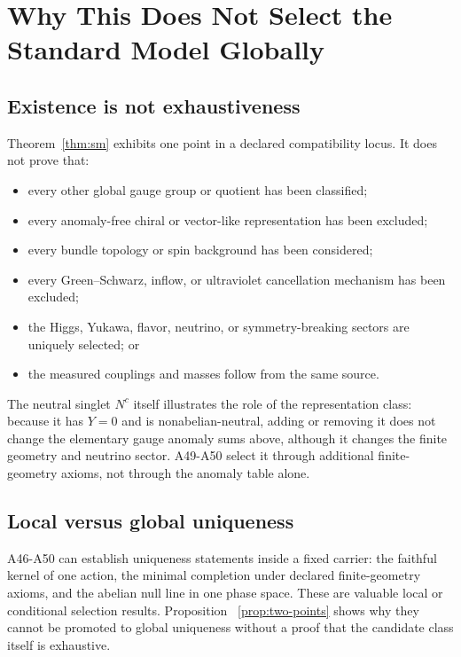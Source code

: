 \documentclass[11pt]{article}
\begin{document}
\section{Why This Does Not Select the Standard Model Globally}

\subsection{Existence is not exhaustiveness}

Theorem~\ref{thm:sm} exhibits one point in a declared compatibility locus.
It does not prove that:
\begin{itemize}
\item every other global gauge group or quotient has been classified;
\item every anomaly-free chiral or vector-like representation has been
excluded;
\item every bundle topology or spin background has been considered;
\item every Green--Schwarz, inflow, or ultraviolet cancellation mechanism has
been excluded;
\item the Higgs, Yukawa, flavor, neutrino, or symmetry-breaking sectors are
uniquely selected; or
\item the measured couplings and masses follow from the same source.
\end{itemize}

The neutral singlet $N^c$ itself illustrates the role of the representation
class: because it has $Y=0$ and is nonabelian-neutral, adding or removing it
does not change the elementary gauge anomaly sums above, although it changes
the finite geometry and neutrino sector.  A49-A50 select it through additional
finite-geometry axioms, not through the anomaly table alone.

\subsection{Local versus global uniqueness}

A46-A50 can establish uniqueness statements inside a fixed carrier:
the faithful kernel of one action, the minimal completion under declared
finite-geometry axioms, and the abelian null line in one phase space.  These
are valuable local or conditional selection results.  Proposition
~\ref{prop:two-points} shows why they cannot be promoted to global uniqueness
without a proof that the candidate class itself is exhaustive.
\end{document}
